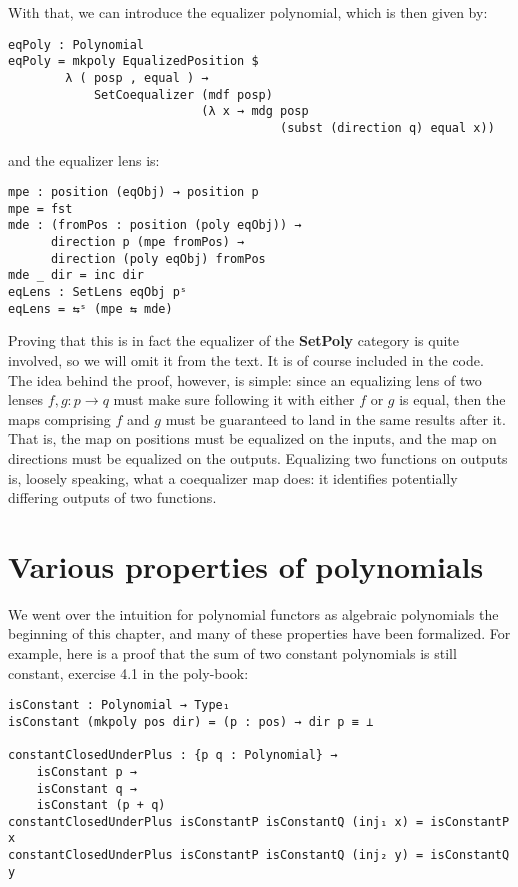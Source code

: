 With that, we can introduce the equalizer polynomial, which is then given by:
\begin{verbatim}
eqPoly : Polynomial
eqPoly = mkpoly EqualizedPosition $ 
        λ ( posp , equal ) → 
            SetCoequalizer (mdf posp) 
                           (λ x → mdg posp 
                                      (subst (direction q) equal x))
\end{verbatim}
and the equalizer lens is:
\begin{verbatim}
mpe : position (eqObj) → position p
mpe = fst
mde : (fromPos : position (poly eqObj)) → 
      direction p (mpe fromPos) → 
      direction (poly eqObj) fromPos
mde _ dir = inc dir
eqLens : SetLens eqObj pˢ
eqLens = ⇆ˢ (mpe ⇆ mde)
\end{verbatim}

Proving that this is in fact the equalizer of the \textbf{SetPoly} category is quite involved, so we will omit it from the text. It is of course included in the code. The idea behind the proof, however, is simple: since an equalizing lens of two lenses $f,g : p \rightarrow q$ must make sure following it with either $f$ or $g$ is equal, then the maps comprising $f$ and $g$ must be guaranteed to land in the same results after it. That is, the map on positions must be equalized on the inputs, and the map on directions must be equalized on the outputs. Equalizing two functions on outputs is, loosely speaking, what a coequalizer map does: it identifies potentially differing outputs of two functions.

\section{Various properties of polynomials}

We went over the intuition for polynomial functors as algebraic polynomials the beginning of this chapter, and many of these properties have been formalized. For example, here is a proof that the sum of two constant polynomials is still constant, exercise 4.1 in the poly-book:

\begin{verbatim}
isConstant : Polynomial → Type₁
isConstant (mkpoly pos dir) = (p : pos) → dir p ≡ ⊥

constantClosedUnderPlus : {p q : Polynomial} → 
    isConstant p → 
    isConstant q → 
    isConstant (p + q)
constantClosedUnderPlus isConstantP isConstantQ (inj₁ x) = isConstantP x
constantClosedUnderPlus isConstantP isConstantQ (inj₂ y) = isConstantQ y
\end{verbatim}


